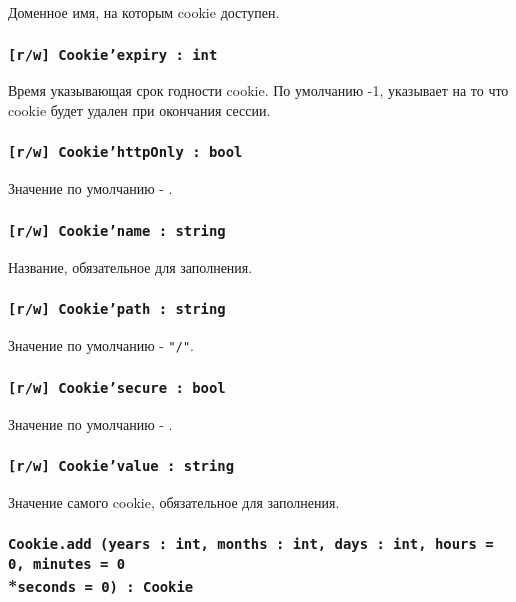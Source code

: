 Доменное имя, на которым cookie доступен.

\subsubsection{\texttt{[r/w] Cookie'expiry : int}}

Время указывающая срок годности cookie. По умолчанию -1, указывает на то что cookie будет удален при окончания сессии.

\subsubsection{\texttt{[r/w] Cookie'httpOnly : bool}}

Значение по умолчанию - \false.

\subsubsection{\texttt{[r/w] Cookie'name : string}}

Название, обязательное для заполнения.

\subsubsection{\texttt{[r/w] Cookie'path : string}}

Значение по умолчанию - \texttt{"/"}.

\subsubsection{\texttt{[r/w] Cookie'secure : bool}}

Значение по умолчанию - \false.

\subsubsection{\texttt{[r/w] Cookie'value : string}}

Значение самого cookie, обязательное для заполнения.

\subsubsection{\texttt{Cookie.add (years : int, months : int, days : int, hours = 0, minutes = 0}\\*\noindent\texttt{seconds = 0) : Cookie}}

